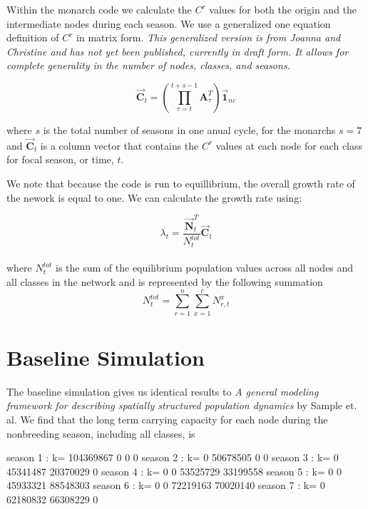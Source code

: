 \documentclass[10pt]{article}
\begin{document}
Within the monarch code we calculate the $C^r$ values for both the origin and the intermediate nodes during each season. We use a generalized one equation definition of $C^r$ in matrix form. {\it{This generalized version is from Joanna and Christine and has not yet been published, currently in draft form. It allows for complete generality in the number of nodes, classes, and seasons.}}

\begin{equation}
\vec{\mathbf{C}}_t=\left(\prod_{\tau=t}^{t+s-1}\mathbf{A}_\tau^T\right)\vec{\mathbf{1}}_{nc}
\end{equation}

where $s$ is the total number of seasons in one anual cycle, for the monarchs $s=7$ and $\vec{\mathbf{C}}_t$ is a column vector that contains the $C^r$ values at each node for each class for focal season, or time, $t$. 

We note that because the code is run to equillibrium, the overall growth rate of the nework is equal to one. We can calculate the growth rate using:

\begin{equation}
\lambda_t= \frac{\vec{\mathbf{N}}_t^T}{N_t^{tot}}\vec{\mathbf{C}}_t
\label{lambda}
\end{equation}\\
where $N_t^{tot}$ is the sum of the equilibrium population values across all nodes and all classes in the network and is represented by the following summation
\begin{equation}
N_t^{tot}=\sum_{r=1}^n\sum_{x=1}^{c}N^x_{r,t}
\end{equation}

\section{Baseline Simulation}
% 
The baseline simulation gives us identical results to {\it{A general modeling framework for describing spatially
structured population dynamics}} by Sample et. al. We find that the long term carrying capacity for each node during the nonbreeding season, including all classes, is

\begin{Schunk}
\begin{Soutput}
season 1 : k= 104369867 0 0 0
season 2 : k= 0 50678505 0 0
season 3 : k= 0 45341487 20370029 0
season 4 : k= 0 0 53525729 33199558
season 5 : k= 0 0 45933321 88548303
season 6 : k= 0 0 72219163 70020140
season 7 : k= 0 62180832 66308229 0
\end{Soutput}
\end{Schunk}
\end{document}
